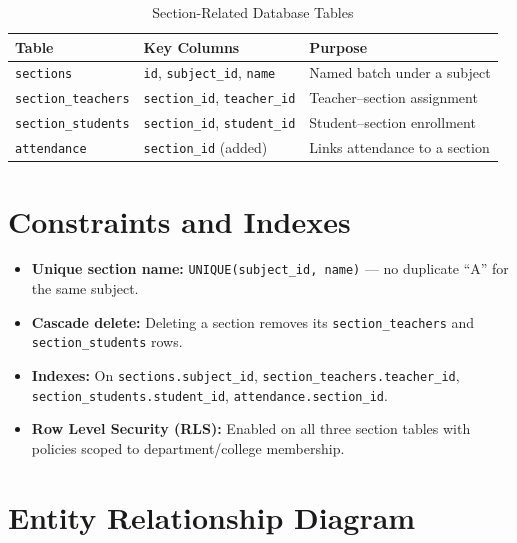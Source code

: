 \documentclass[11pt,a4paper,oneside]{report}
\begin{document}
\begin{table}[H]
  \centering
  \caption{Section-Related Database Tables}
  \label{tab:tables}
  \begin{tabular}{@{}p{3.2cm}p{4.5cm}p{5.3cm}@{}}
    \toprule
    \textbf{Table} & \textbf{Key Columns} & \textbf{Purpose} \\
    \midrule
    \texttt{sections} & \texttt{id}, \texttt{subject\_id}, \texttt{name} & Named batch under a subject \\
    \texttt{section\_teachers} & \texttt{section\_id}, \texttt{teacher\_id} & Teacher--section assignment \\
    \texttt{section\_students} & \texttt{section\_id}, \texttt{student\_id} & Student--section enrollment \\
    \texttt{attendance} & \texttt{section\_id} (added) & Links attendance to a section \\
    \bottomrule
  \end{tabular}
\end{table}

\section{Constraints and Indexes}

\begin{itemize}[leftmargin=1.5em]
  \item \textbf{Unique section name:} \texttt{UNIQUE(subject\_id, name)} --- no duplicate ``A'' for the same subject.
  \item \textbf{Cascade delete:} Deleting a section removes its \texttt{section\_teachers} and \texttt{section\_students} rows.
  \item \textbf{Indexes:} On \texttt{sections.subject\_id}, \texttt{section\_teachers.teacher\_id}, \texttt{section\_students.student\_id}, \texttt{attendance.section\_id}.
  \item \textbf{Row Level Security (RLS):} Enabled on all three section tables with policies scoped to department/college membership.
\end{itemize}

\section{Entity Relationship Diagram}
\end{document}

